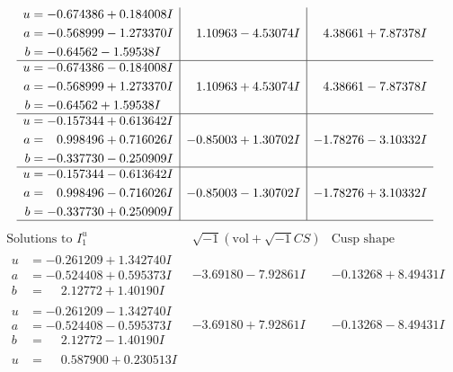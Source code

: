 \documentclass[1p]{elsarticle_modified}
\theoremstyle{definition}
\newcommand{\I}{\sqrt{-1}}
\begin{document}
$$\begin{array}{c|c|c}
\begin{aligned}
u &= -0.674386 + 0.184008 I \\
a &= -0.568999 - 1.273370 I \\
b &= -0.64562 - 1.59538 I\end{aligned}
 & \phantom{-}1.10963 - 4.53074 I & \phantom{-}4.38661 + 7.87378 I \\ \hline\begin{aligned}
u &= -0.674386 - 0.184008 I \\
a &= -0.568999 + 1.273370 I \\
b &= -0.64562 + 1.59538 I\end{aligned}
 & \phantom{-}1.10963 + 4.53074 I & \phantom{-}4.38661 - 7.87378 I \\ \hline\begin{aligned}
u &= -0.157344 + 0.613642 I \\
a &= \phantom{-}0.998496 + 0.716026 I \\
b &= -0.337730 - 0.250909 I\end{aligned}
 & -0.85003 + 1.30702 I & -1.78276 - 3.10332 I \\ \hline\begin{aligned}
u &= -0.157344 - 0.613642 I \\
a &= \phantom{-}0.998496 - 0.716026 I \\
b &= -0.337730 + 0.250909 I\end{aligned}
 & -0.85003 - 1.30702 I & -1.78276 + 3.10332 I\\
 \hline 
 \end{array}$$\newpage$$\begin{array}{c|c|c}  
\text{Solutions to }I^u_{1}& \I (\text{vol} + \sqrt{-1}CS) & \text{Cusp shape}\\
 \hline 
\begin{aligned}
u &= -0.261209 + 1.342740 I \\
a &= -0.524408 + 0.595373 I \\
b &= \phantom{-}2.12772 + 1.40190 I\end{aligned}
 & -3.69180 - 7.92861 I & -0.13268 + 8.49431 I \\ \hline\begin{aligned}
u &= -0.261209 - 1.342740 I \\
a &= -0.524408 - 0.595373 I \\
b &= \phantom{-}2.12772 - 1.40190 I\end{aligned}
 & -3.69180 + 7.92861 I & -0.13268 - 8.49431 I \\ \hline\begin{aligned}
u &= \phantom{-}0.587900 + 0.230513 I \\

\end{aligned}
\end{array}$$
\end{document}

